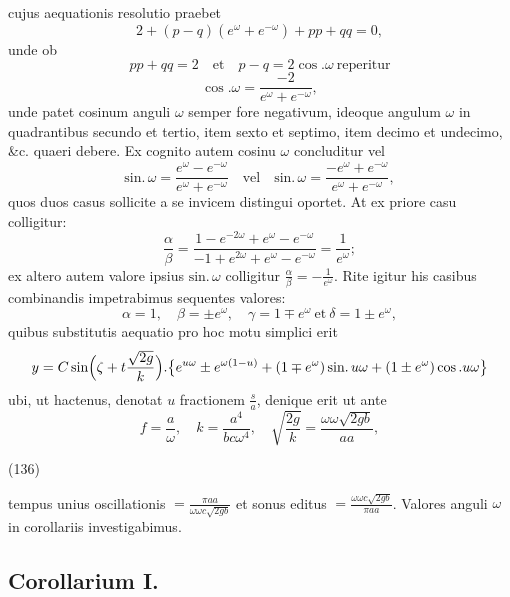 \documentclass[11pt,a4paper]{article}
\begin{document}
cujus aequationis resolutio praebet
\[
2 + (p - q)(e^\omega + e^{-\omega}) + pp + qq = 0,
\]
unde ob
\[
pp + qq = 2 \quad\text{et}\quad p - q = 2\cos.\omega \ \text{reperitur}
\]
\[
\cos.\omega = \frac{-2}{e^\omega + e^{-\omega}},
\]
unde patet cosinum anguli \emph{$\omega$} semper fore negativum, ideoque angulum
$\omega$ in quadrantibus secundo et tertio, item sexto et septimo, item decimo et
undecimo, \&c. quaeri debere. Ex cognito autem cosinu \emph{$\omega$} concluditur vel
\[
\text{sin.}\,\omega = \frac{e^\omega - e^{-\omega}}{e^\omega + e^{-\omega}} \quad\text{vel}\quad \text{sin.}\,\omega = \frac{-e^\omega + e^{-\omega}}{e^\omega + e^{-\omega}},
\]
quos duos casus sollicite a se invicem distingui oportet. At ex priore casu
colligitur:
\[
\frac{\alpha}{\beta} = \frac{1 - e^{-2\omega} + e^\omega - e^{-\omega}}{-1 + e^{2\omega} + e^\omega - e^{-\omega}} = \frac{1}{e^\omega};
\]
ex altero autem valore ipsius $\text{sin.}\,\omega$ colligitur
$\frac{\alpha}{\beta} = -\frac{1}{e^\omega}$. Rite igitur his casibus combinandis
impetrabimus sequentes valores:
\[
\alpha = 1, \quad \beta = \pm e^\omega, \quad \gamma = 1 \mp e^\omega \ \text{et}\ \delta = 1 \pm e^\omega,
\]
quibus substitutis aequatio pro hoc motu simplici erit
\[
y = C\,\text{sin}\Bigl(\zeta + t\frac{\sqrt{2g}}{k}\Bigr).\bigl\{e^{u\omega} \pm e^{\omega(1-u)} + (1 \mp e^\omega)\,\text{sin.}\,u\omega + (1 \pm e^\omega)\cos.u\omega\bigr\}
\]
ubi, ut hactenus, denotat $u$ fractionem $\frac{s}{a}$, denique erit ut ante
\[
f = \frac{a}{\omega}, \quad k = \frac{a^4}{bc\omega^4}, \quad \sqrt{\frac{2g}{k}} = \frac{\omega\omega\sqrt{2gb}}{aa},
\]

(136)

tempus unius oscillationis $= \frac{\pi aa}{\omega\omega c\sqrt{2gb}}$ et sonus editus
$= \frac{\omega\omega c\sqrt{2gb}}{\pi aa}$. Valores anguli $\omega$ in corollariis
investigabimus.

\subsection{Corollarium I.}
\end{document}
